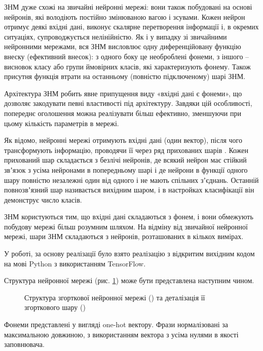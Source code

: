 ЗНМ дуже схожі на звичайні нейронні мережі: вони також побудовані на основі нейронів, які володіють постійно змінюваною вагою і зсувами. Кожен нейрон отримує деякі вхідні дані, виконує скалярне перетворення інформації і, в окремих ситуаціях, супроводжується нелінійністю. Як і у випадку зі звичайними нейронними мережами, вся ЗНМ висловлює одну диференційовану функцію внеску (ефективний внесок): з одного боку це необроблені фонеми, з іншого – висновок класу або групи ймовірних класів, які характеризують фонему. Також присутня функція втрати на останньому (повністю підключеному) шарі ЗНМ.

Архітектура ЗНМ робить явне припущення виду «вхідні дані є фонеми», що дозволяє закодувати певні властивості під архітектуру. Завдяки цій особливості, попереднє оголошення можна реалізувати більш ефективно, зменшуючи при цьому кількість параметрів в мережі.

Як відомо, нейронні мережі отримують вхідні дані (один вектор), після чого трансформують інформацію, проводячи її через ряд прихованих шарів \cite{Kim_2014, Zhang_2015}. Кожен прихований шар складається з безлічі нейронів, де всякий нейрон має стійкий звʼязок з усіма нейронами в попередньому шарі і де нейрони в функції одного шару повністю незалежні один від одного і не мають спільних зʼєднань. Останній повнозвʼязний шар називається вихідним шаром, і в настройках класифікації він демонструє число класів.

ЗНМ користуються тим, що вхідні дані складаються з фонем, і вони обмежують побудову мережі більш розумним шляхом. На відміну від звичайної нейронної мережі, шари ЗНМ складаються з нейронів, розташованих в кількох вимірах.

У роботі, за основу реалізації було взято реалізацію з відкритим вихідним кодом \cite{Britz_2015} на мові Python з використанням TensorFlow.

Структура нейронної мережі (рис. \ref{img:cnn-struct}) може бути представлена наступним чином.

\begin{figure}
	\centering
	\hfill
	\caption{Структура згорткової нейронної мережі () та деталізація її згорткового шару ()}
	\label{img:cnn-struct}
\end{figure}

Фонеми представлені у вигляді one-hot вектору. Фрази нормалізовані за максимальною довжиною, з використанням вектора з усіма нулями в якості заповнювача.


